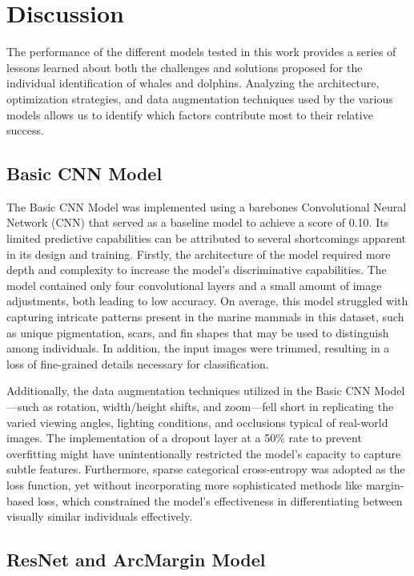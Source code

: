 \documentclass[twocolumn]{article}
\begin{document}
\section{Discussion}

The performance of the different models tested in this work provides a series of lessons learned about both the challenges and solutions proposed for the individual identification of whales and dolphins. Analyzing the architecture, optimization strategies, and data augmentation techniques used by the various models allows us to identify which factors contribute most to their relative success.

\subsection{Basic CNN Model}

The Basic CNN Model was implemented using a barebones Convolutional Neural Network (CNN) that served as a baseline model to achieve a score of 0.10. Its limited predictive capabilities can be attributed to several shortcomings apparent in its design and training. Firstly, the architecture of the model required more depth and complexity to increase the model’s discriminative capabilities. The model contained only four convolutional layers and a small amount of image adjustments, both leading to low accuracy. On average, this model struggled with capturing intricate patterns present in the marine mammals in this dataset, such as unique pigmentation, scars, and fin shapes that may be used to distinguish among individuals. In addition, the input images were trimmed, resulting in a loss of fine-grained details necessary for classification. 

Additionally, the data augmentation techniques utilized in the Basic CNN Model—such as rotation, width/height shifts, and zoom—fell short in replicating the varied viewing angles, lighting conditions, and occlusions typical of real-world images. The implementation of a dropout layer at a 50\% rate to prevent overfitting might have unintentionally restricted the model’s capacity to capture subtle features. Furthermore, sparse categorical cross-entropy was adopted as the loss function, yet without incorporating more sophisticated methods like margin-based loss, which constrained the model’s effectiveness in differentiating between visually similar individuals effectively.

\subsection{ResNet and ArcMargin Model}
\end{document}
